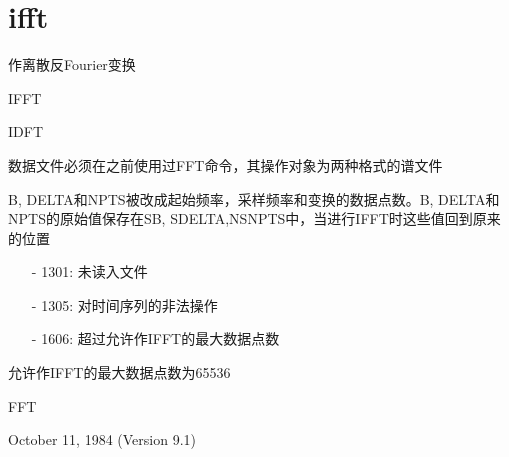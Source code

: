 \section{ifft}
\label{cmd:ifft}

作离散反Fourier变换

IFFT

IDFT

数据文件必须在之前使用过FFT命令，其操作对象为两种格式的谱文件

B, DELTA和NPTS被改成起始频率，采样频率和变换的数据点数。B, DELTA和NPTS的原始值保存在SB, SDELTA,NSNPTS中，当进行IFFT时这些值回到原来的位置

\begin{itemize}
\item[-]1301: 未读入文件
\item[-] 1305: 对时间序列的非法操作
\item[-]1606: 超过允许作IFFT的最大数据点数
\end{itemize}

允许作IFFT的最大数据点数为65536

FFT

October 11, 1984 (Version 9.1)
